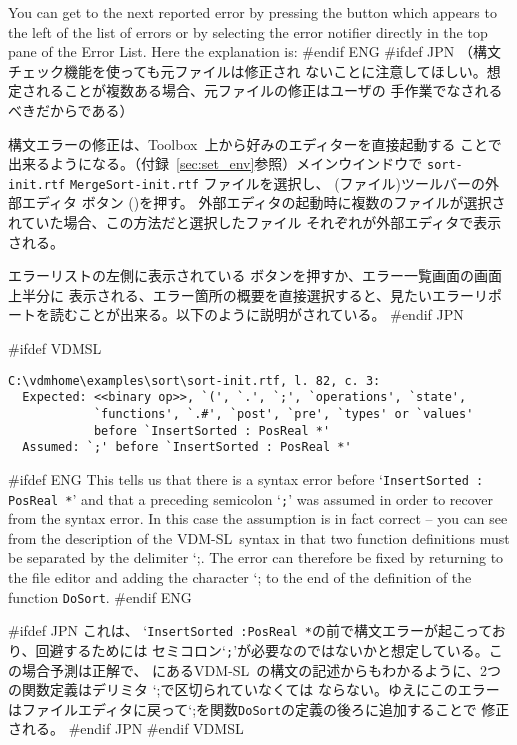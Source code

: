 \documentclass[\pformat,12pt]{article}
\newcommand{\vdmslpp}{VDM-SL}
\newcommand{\Toolbox}{Toolbox}
\newcommand{\vdmhome}{vdmhome}
\newcommand{\vdmslpp}{VDM++}
\newcommand{\Toolbox}{Toolbox}
\newcommand{\vdmhome}{vpphome}
\newcommand{\Lit}[1]{`#1\Quote}
\newcommand{\aaa}{\tt }
\newcommand{\guicmd}[1]{{\sf #1}}
\newcommand{\guicmd}[1]{{\gt #1}}
\begin{document}
You can get to the next reported error by pressing the {\fbox{\tt >}}
button which appears to the left of the list of errors or by selecting the
error notifier directly in the top pane of the \guicmd{Error
  List}. Here the explanation is: 
#endif ENG
#ifdef JPN
（構文チェック機能を使っても元ファイルは修正され
ないことに注意してほしい。想定されることが複数ある場合、元ファイルの修正はユーザの
手作業でなされるべきだからである）

構文エラーの修正は、\Toolbox\ 上から好みのエディターを直接起動する
ことで出来るようになる。（付録~\ref{sec:set_env}参照）メインウインドウで
{
{\tt sort-init.rtf}
}
{
{\tt MergeSort-init.rtf}
}
ファイルを選択し、
(\guicmd{ファイル})ツールバーの\guicmd{外部エディタ} ボタン
()を押す。
外部エディタの起動時に複数のファイルが選択されていた場合、この方法だと選択したファイル
それぞれが\guicmd{外部エディタ}で表示される。

エラーリストの左側に表示されている {\fbox{\tt >}}ボタンを押すか、\guicmd{エラー一覧}画面の画面上半分に
表示される、エラー箇所の概要を直接選択すると、見たいエラーリポートを読むことが出来る。以下のように説明がされている。
#endif JPN

#ifdef VDMSL
\begin{verbatim}
C:\vdmhome\examples\sort\sort-init.rtf, l. 82, c. 3:
  Expected: <<binary op>>, `(', `.', `;', `operations', `state',
            `functions', `.#', `post', `pre', `types' or `values' 
            before `InsertSorted : PosReal *'
  Assumed: `;' before `InsertSorted : PosReal *'
\end{verbatim}

#ifdef ENG
This tells us that there is a syntax error before `{\tt InsertSorted :
  PosReal *}' and that a preceding semicolon `{\tt ;}' was assumed in
  order to recover from the syntax error. In this case the assumption
  is in fact correct -- you can see from the  description of the
\vdmslpp\ syntax in \cite{UMLMan-CSK} that two function definitions must
  be separated by the delimiter \Lit{;}. The error can therefore be
  fixed by returning to the file editor and adding the character
  \Lit{;} to the end of the definition of the function {\aaa DoSort}.
#endif ENG

#ifdef JPN
これは、 `{\tt InsertSorted :PosReal *}の前で構文エラーが起こっており、回避するためには
セミコロン`{\tt ;}'が必要なのではないかと想定している。この場合予測は正解で、 \cite{UMLMan-CSK}
にある\vdmslpp\ の構文の記述からもわかるように、2つの関数定義はデリミタ \Lit{;}で区切られていなくては
ならない。ゆえにこのエラーはファイルエディタに戻って\Lit{;}を関数{\aaa DoSort}の定義の後ろに追加することで
修正される。
#endif JPN
#endif VDMSL
\end{document}
